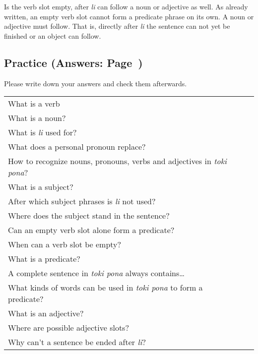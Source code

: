 Is the verb slot empty, after \textit{li} can follow a noun or adjective as well.
As already written, an empty verb slot cannot form a predicate phrase on its own.
A noun or adjective must follow.
That is, directly after \textit{li} the sentence can not yet be finished or an object can follow.

\newpage

\subsection*{Practice (Answers: Page~\pageref{'basic_sentences'})}
Please write down your answers and check them afterwards.

\begin{supertabular}{p{5,5cm}|ll}
    What is a verb                                                                &  & \\
    What is a noun?                                                               &  & \\
    What is \textit{li} used for?                                                 &  & \\
    What does a personal pronoun replace?                                         &  & \\
    How to recognize nouns, pronouns, verbs and adjectives in \textit{toki pona}? &  & \\
    What is a subject?                                                            &  & \\
    After which subject phrases is \textit{li} not used?                          &  & \\
    Where does the subject stand in the sentence?                                 &  & \\
    Can an empty verb slot alone form a predicate?                                &  & \\
    When can a verb slot be empty?                                                &  & \\
    What is a predicate?                                                          &  & \\
    A complete sentence in \textit{toki pona} always contains\dots                &  & \\
    What kinds of words can be used in \textit{toki pona} to form a predicate?    &  & \\
    What is an adjective?                                                         &  & \\
    Where are possible adjective slots?                                           &  & \\
    Why can't a sentence be ended after \textit{li}?                              &  & \\
\end{supertabular}

